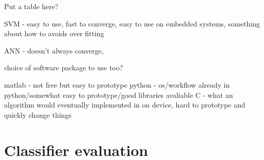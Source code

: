 Put a table here?

SVM - easy to use, fast to converge, easy to use on embedded systems, something about how to avoids over fitting

ANN - doesn't always converge, 


choice of software package to use too?

matlab - not free but easy to prototype
python - os/workflow already in python/somewhat easy to prototype/good libraries avaliable
C - what an algorithm would eventually implemented in on device, hard to prototype and quickly change things


\section{Classifier evaluation}
